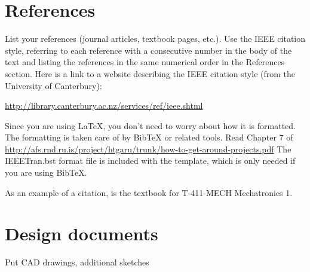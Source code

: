 \documentclass[svn, draft]{rureport}
\begin{document}
\section{References}
List your references (journal articles, textbook pages, etc.). Use the
IEEE citation style, referring to each reference with a consecutive
number in the body of the text and listing the references in the same
numerical order in the References section. Here is a link to a website
describing the IEEE citation style (from the University of
Canterbury):

\url{http://library.canterbury.ac.nz/services/ref/ieee.shtml}

Since you are using \LaTeX{}, you don't need to worry about how it is formatted.
The formatting is taken care of by BibTeX or related tools.  Read Chapter 7 of 
\url{http://afs.rnd.ru.is/project/htgaru/trunk/how-to-get-around-projects.pdf}
The IEEETran.bst format file is included with the template, which is only needed if you are using BibTeX.

As an example of a citation, \cite{carryer2011IntroMechatronics} is
the textbook for T-411-MECH Mechatronics 1.




\newpage
\appendix
\section{Design documents}
Put CAD drawings, additional sketches
\end{document}
